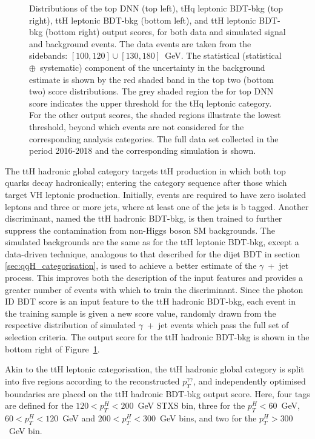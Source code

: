 \begin{figure}[htb!]
  \caption[Output scores of the discriminants used for the top-associated production mode categories]
  {
    Distributions of the top DNN (top left), tHq leptonic BDT-bkg (top right), ttH leptonic BDT-bkg (bottom left), and  ttH leptonic BDT-bkg (bottom right) output scores, for both data and simulated signal and background events. The data events are taken from the \mgg sidebands: $[100,120]\cup[130,180]$~GeV. The statistical (statistical~$\oplus$~systematic) component of the uncertainty in the background estimate is shown by the red shaded band in the top two (bottom two) score distributions. The grey shaded region the for top DNN score indicates the upper threshold for the tHq leptonic category. For the other output scores, the shaded regions illustrate the lowest threshold, beyond which events are not considered for the corresponding analysis categories. The full data set collected in the period 2016-2018 and the corresponding simulation is shown.
  }
  \label{fig:categorisation_top}
\end{figure}

The ttH hadronic global category targets ttH production in which both top quarks decay hadronically; entering the category sequence after those which target VH leptonic production. Initially, events are required to have zero isolated leptons and three or more jets, where at least one of the jets is b tagged. Another discriminant, named the ttH hadronic BDT-bkg, is then trained to further suppress the contamination from non-Higgs boson SM backgrounds. The simulated backgrounds are the same as for the ttH leptonic BDT-bkg, except a data-driven technique, analogous to that described for the dijet BDT in section \ref{sec:qqH_categorisation}, is used to achieve a better estimate of the $\gamma$~+~jet process. This improves both the description of the input features and provides a greater number of events with which to train the discriminant. Since the photon ID BDT score is an input feature to the ttH hadronic BDT-bkg, each event in the training sample is given a new score value, randomly drawn from the respective distribution of simulated $\gamma$~+~jet events which pass the full set of selection criteria. The output score for the ttH hadronic BDT-bkg is shown in the bottom right of Figure~\ref{fig:categorisation_top}.

Akin to the ttH leptonic categorisation, the ttH hadronic global category is split into five regions according to the reconstructed $p_T^{\gamma\gamma}$, and independently optimised boundaries are placed on the ttH hadronic BDT-bkg output score. Here, four tags are defined for the $120<p_T^H<200$~GeV STXS bin, three for the $p_T^H<60$~GeV, $60<p_T^H<120$~GeV and $200<p_T^H<300$~GeV bins, and two for the $p_T^H>300$~GeV bin. 

